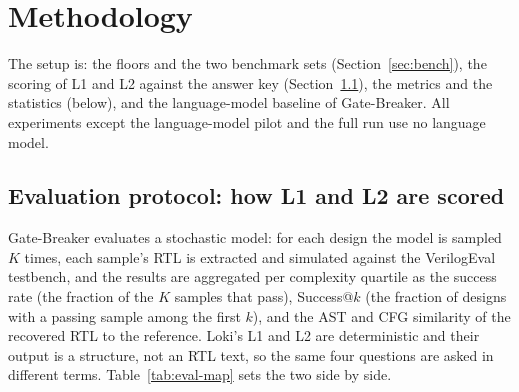 \documentclass[conference]{IEEEtran}
\begin{document}
\section{Methodology}
\label{sec:method}

The setup is: the floors and the two benchmark sets (Section~\ref{sec:bench}), the scoring of L1 and
L2 against the answer key (Section~\ref{sec:eval}), the metrics and the statistics (below), and
the language-model baseline of Gate-Breaker. All experiments except the language-model pilot and the full run use
no language model.

\subsection{Evaluation protocol: how L1 and L2 are scored}
\label{sec:eval}

Gate-Breaker evaluates a stochastic model: for each design the model is sampled $K$ times,
each sample's RTL is extracted and simulated against the VerilogEval testbench, and the
results are aggregated per complexity quartile as the success rate (the fraction of the $K$
samples that pass), Success@$k$ (the fraction of designs with a passing sample among the first
$k$), and the AST and CFG similarity of the recovered RTL to the reference. Loki's L1 and L2
are deterministic and their output is a structure, not an RTL text, so the same four
questions are asked in different terms. Table~\ref{tab:eval-map} sets the two side by side.
\end{document}
